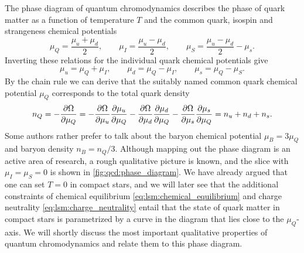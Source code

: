 The phase diagram of quantum chromodynamics describes the phase of quark matter
as a function of temperature $T$ and the common quark, isospin and strangeness chemical potentials
\begin{equation}
	\mu_Q = \frac{\mu_u + \mu_d}{2}, \qquad
	\mu_I = \frac{\mu_u - \mu_d}{2}, \qquad
	\mu_S = \frac{\mu_u - \mu_d}{2} - \mu_s.
\end{equation}
Inverting these relations for the individual quark chemical potentials give
\begin{equation}
	\mu_u = \mu_Q + \mu_I, \qquad
	\mu_d = \mu_Q - \mu_I, \qquad
	\mu_s = \mu_Q - \mu_S .
\end{equation}
By the chain rule we can derive that the suitably named common quark chemical potential $\mu_Q$ corresponds to the total quark density
\begin{equation}
	n_Q = -\pdv{\Omega}{\mu_Q} =
	-\pdv{\Omega}{\mu_u} \pdv{\mu_u}{\mu_Q}
	-\pdv{\Omega}{\mu_d} \pdv{\mu_d}{\mu_Q}
	-\pdv{\Omega}{\mu_s} \pdv{\mu_s}{\mu_Q} =
	n_u + n_d + n_s.
\end{equation}
Some authors rather prefer to talk about the baryon chemical potential $\mu_B = 3 \mu_Q$ and baryon density $n_B = n_Q / 3$.
Although mapping out the phase diagram is an active area of research, a rough qualitative picture is known, and the slice with $\mu_I = \mu_S = 0$ is shown in \cref{fig:qcd:phase_diagram}.
We have already argued that one can set $T=0$ in compact stars,
and we will later see that the additional constraints of chemical equilibrium \eqref{eq:lsm:chemical_equilibrium} and charge neutrality \eqref{eq:lsm:charge_neutrality} entail that
the state of quark matter in compact stars is parametrized by a curve in the diagram that lies close to the $\mu_Q$-axis.
We will shortly discuss the most important qualitative properties of quantum chromodynamics and relate them to this phase diagram.

